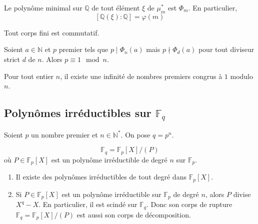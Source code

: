	\begin{corollary}
		Le polynôme minimal sur $\mathbb{Q}$ de tout élément $\xi$ de $\mu_m^*$ est $\Phi_m$. En particulier,
		\[ [\mathbb{Q}(\xi):\mathbb{Q}]=\varphi(m) \]
	\end{corollary}

	\begin{application}
		Tout corps fini est commutatif.
	\end{application}


	\begin{lemma}
		Soient $a \in \mathbb{N}$ et $p$ premier tels que $p \mid \Phi_n(a)$ mais $p \nmid \Phi_d(a)$ pour tout diviseur strict $d$ de $n$. Alors $p \equiv 1 \mod n$.
	\end{lemma}


	\begin{application}
		Pour tout entier $n$, il existe une infinité de nombres premiers congrus à $1$ modulo $n$.
	\end{application}

	\subsection{Polynômes irréductibles sur \texorpdfstring{$\mathbb{F}_q$}{Fq}}

	Soient $p$ un nombre premier et $n \in \mathbb{N}^*$. On pose $q = p^n$.

	\begin{theorem}
		\[ \mathbb{F}_q = \mathbb{F}_p[X] / (P) \]
		où $P \in \mathbb{F}_p[X]$ est un polynôme irréductible de degré $n$ sur $\mathbb{F}_p$.
	\end{theorem}

	\begin{corollary}
		\begin{enumerate}[label=(\roman*)]
			\item Il existe des polynômes irréductibles de tout degré dans $\mathbb{F}_p[X]$.
			\item Si $P \in \mathbb{F}_p[X]$ est un polynôme irréductible sur $\mathbb{F}_p$ de degré $n$, alors $P$ divise $X^q - X$. En particulier, il est scindé sur $\mathbb{F}_q$. Donc son corps de rupture $\mathbb{F}_q = \mathbb{F}_p[X] / (P)$ est aussi son corps de décomposition.
		\end{enumerate}
	\end{corollary}

